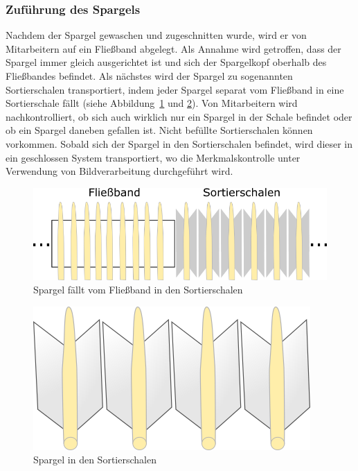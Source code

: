 \documentclass{ezb}
\begin{document}
\subsubsection*{Zuführung des Spargels}
Nachdem der Spargel gewaschen und zugeschnitten wurde, wird er von Mitarbeitern auf ein Fließband abgelegt. Als Annahme wird getroffen, dass der Spargel immer gleich ausgerichtet ist und sich der Spargelkopf oberhalb des Fließbandes befindet. Als nächstes wird der Spargel zu sogenannten Sortierschalen transportiert, indem jeder Spargel separat vom Fließband in eine Sortierschale fällt (siehe Abbildung~\ref{fig:fliessband} und \ref{fig:sortierschale}). Von Mitarbeitern wird nachkontrolliert, ob sich auch wirklich nur ein Spargel in der Schale befindet oder ob ein Spargel daneben gefallen ist. Nicht befüllte Sortierschalen können vorkommen. Sobald sich der Spargel in den Sortierschalen befindet, wird dieser in ein geschlossen System transportiert, wo die Merkmalskontrolle unter Verwendung von Bildverarbeitung durchgeführt wird.
\begin{figure}[!h]
	\begin{center}
		\includegraphics[scale=1.0]{fliessband_zu_sortierschalen.png}
	\end{center}
	\caption{Spargel fällt vom Fließband in den Sortierschalen}
	\label{fig:fliessband}
\end{figure}

\begin{figure}[!h]
	\begin{center}
		\includegraphics[scale=1.0]{sortierschalen.png}
	\end{center}
	\caption{Spargel in den Sortierschalen}
	\label{fig:sortierschale}
\end{figure}
\end{document}
